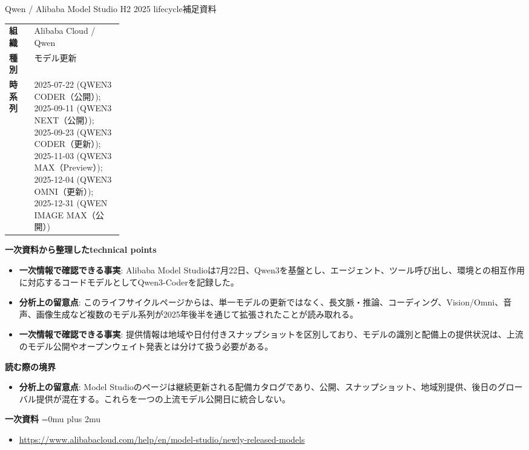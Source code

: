 \begin{technicalnote}{Qwen / Alibaba Model Studio H2 2025 lifecycle}{補足資料}
\begingroup
\begin{tabularx}{\linewidth}{@{}>{\bfseries}p{0.22\linewidth}X@{}}
組織 & Alibaba Cloud / Qwen \\
種別 & モデル更新 \\
時系列 & 2025-07-22 (QWEN3 CODER（公開）); 2025-09-11 (QWEN3 NEXT（公開）); 2025-09-23 (QWEN3 CODER（更新）); 2025-11-03 (QWEN3 MAX（Preview）); 2025-12-04 (QWEN3 OMNI（更新）); 2025-12-31 (QWEN IMAGE MAX（公開）) \\
\end{tabularx}
\smallskip
{\bfseries 一次資料から整理したtechnical points}
\begin{itemize}[leftmargin=1.5em,itemsep=0.35em]
\item \textbf{一次情報で確認できる事実}: Alibaba Model Studioは7月22日、Qwen3を基盤とし、エージェント、ツール呼び出し、環境との相互作用に対応するコードモデルとしてQwen3-Coderを記録した。
\item \textbf{分析上の留意点}: このライフサイクルページからは、単一モデルの更新ではなく、長文脈・推論、コーディング、Vision/Omni、音声、画像生成など複数のモデル系列が2025年後半を通じて拡張されたことが読み取れる。
\item \textbf{一次情報で確認できる事実}: 提供情報は地域や日付付きスナップショットを区別しており、モデルの識別と配備上の提供状況は、上流のモデル公開やオープンウェイト発表とは分けて扱う必要がある。
\end{itemize}
\begin{minipage}{\linewidth}
{\bfseries 読む際の境界}
\begin{itemize}[leftmargin=1.5em,itemsep=0.35em]
\item \textbf{分析上の留意点}: Model Studioのページは継続更新される配備カタログであり、公開、スナップショット、地域別提供、後日のグローバル提供が混在する。これらを一つの上流モデル公開日に統合しない。
\end{itemize}
\begin{samepage}
{\bfseries 一次資料}
\begingroup\sloppy
\Urlmuskip=0mu plus 2mu\relax
\begin{itemize}[leftmargin=1.5em,itemsep=0.25em]
\item {\scriptsize\url{https://www.alibabacloud.com/help/en/model-studio/newly-released-models}}
\end{itemize}
\endgroup
\end{samepage}
\end{minipage}
\endgroup
\end{technicalnote}
\medskip

